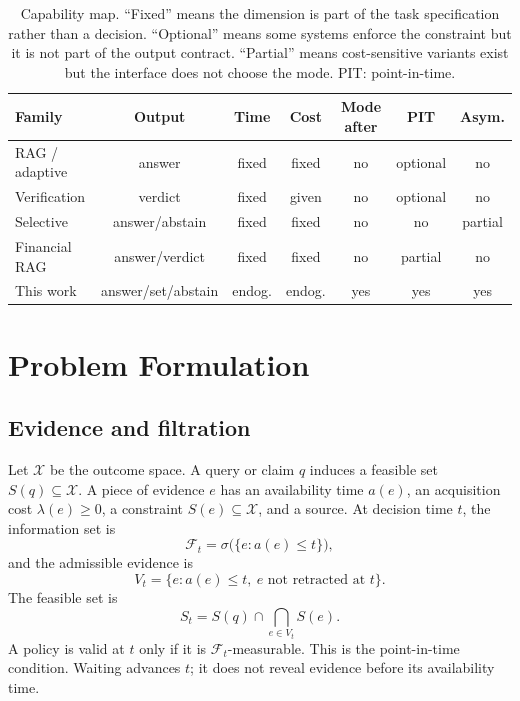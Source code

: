 \documentclass[11pt]{article}
\begin{document}
\begin{table}[t]
\centering
\small
\setlength{\tabcolsep}{5pt}
\begin{tabular}{lcccccc}
\toprule
Family & Output & Time & Cost & Mode after & PIT & Asym. \\
\midrule
RAG / adaptive & answer & fixed & fixed & no & optional & no \\
Verification & verdict & fixed & given & no & optional & no \\
Selective & answer/abstain & fixed & fixed & no & no & partial \\
Financial RAG & answer/verdict & fixed & fixed & no & partial & no \\
This work & answer/set/abstain & endog. & endog. & yes & yes & yes \\
\bottomrule
\end{tabular}
\caption{Capability map. ``Fixed'' means the dimension is part of the task specification rather than a decision. ``Optional'' means some systems enforce the constraint but it is not part of the output contract. ``Partial'' means cost-sensitive variants exist but the interface does not choose the mode. PIT: point-in-time.}
\label{tab:capability}
\end{table}

\section{Problem Formulation}
\label{sec:problem}

\subsection{Evidence and filtration}
Let $\mathcal X$ be the outcome space. A query or claim $q$ induces a feasible set $S(q)\subseteq\mathcal X$. A piece of evidence $e$ has an availability time $a(e)$, an acquisition cost $\lambda(e)\ge 0$, a constraint $S(e)\subseteq\mathcal X$, and a source. At decision time $t$, the information set is
\begin{equation}
\mathcal F_t=\sigma\bigl(\{e: a(e)\le t\}\bigr),
\end{equation}
and the admissible evidence is
\begin{equation}
V_t=\{e: a(e)\le t,\ e\text{ not retracted at }t\}.
\end{equation}
The feasible set is
\begin{equation}
S_t=S(q)\cap\bigcap_{e\in V_t}S(e).
\label{eq:feasible}
\end{equation}
A policy is valid at $t$ only if it is $\mathcal F_t$-measurable. This is the point-in-time condition. Waiting advances $t$; it does not reveal evidence before its availability time.
\end{document}
